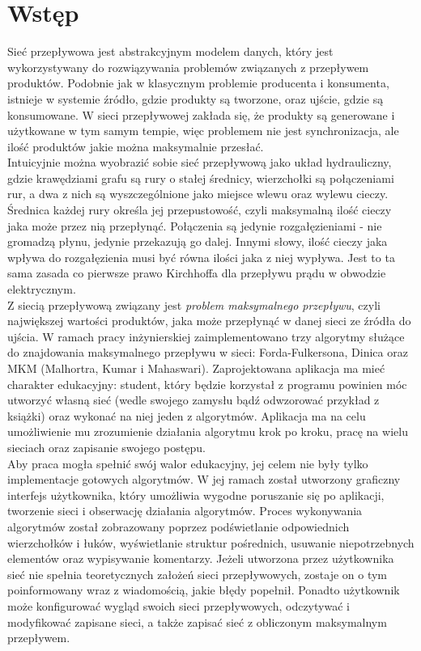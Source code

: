 \chapter{Wstęp}
Sieć przepływowa jest abstrakcyjnym modelem danych, który jest wykorzystywany do rozwiązywania problemów związanych z przepływem produktów. Podobnie jak w klasycznym problemie producenta i konsumenta, istnieje w systemie źródło, gdzie produkty są tworzone, oraz ujście, gdzie są konsumowane. W sieci przepływowej zakłada się, że produkty są generowane i użytkowane w tym samym tempie, więc problemem nie jest synchronizacja, ale ilość produktów jakie można maksymalnie przesłać.\\\indent
Intuicyjnie można wyobrazić sobie sieć przepływową jako układ hydrauliczny, gdzie krawędziami grafu są rury o stałej średnicy, wierzchołki są połączeniami rur, a dwa z nich są wyszczególnione jako miejsce wlewu oraz wylewu cieczy. Średnica każdej rury określa jej przepustowość, czyli maksymalną ilość cieczy jaka może przez nią przepłynąć. Połączenia są jedynie rozgałęzieniami - nie gromadzą płynu, jedynie przekazują go dalej. Innymi słowy, ilość cieczy jaka wpływa do rozgałęzienia musi być równa ilości jaka z niej wypływa. Jest to ta sama zasada co pierwsze prawo Kirchhoffa dla przepływu prądu w obwodzie elektrycznym.\\\indent
Z siecią przepływową związany jest \textit{problem maksymalnego przepływu}, czyli największej wartości produktów, jaka może przepłynąć w danej sieci ze źródła do ujścia. W ramach pracy inżynierskiej zaimplementowano trzy algorytmy służące do znajdowania maksymalnego przepływu w sieci: Forda-Fulkersona, Dinica oraz MKM (Malhortra, Kumar i Mahaswari). Zaprojektowana aplikacja ma mieć charakter edukacyjny: student, który będzie korzystał z programu powinien móc utworzyć własną sieć (wedle swojego zamysłu bądź odwzorować przykład z książki) oraz wykonać na niej jeden z algorytmów. Aplikacja ma na celu umożliwienie mu zrozumienie działania algorytmu krok po kroku, pracę na wielu sieciach oraz zapisanie swojego postępu.\\\indent
Aby praca mogła spełnić swój walor edukacyjny, jej celem nie były tylko implementacje gotowych algorytmów. W jej ramach został utworzony graficzny interfejs użytkownika, który umożliwia wygodne poruszanie się po aplikacji, tworzenie sieci i obserwację działania algorytmów. Proces wykonywania algorytmów został zobrazowany poprzez podświetlanie odpowiednich wierzchołków i łuków, wyświetlanie struktur pośrednich, usuwanie niepotrzebnych elementów oraz wypisywanie komentarzy. Jeżeli utworzona przez użytkownika sieć nie spełnia teoretycznych założeń sieci przepływowych, zostaje on o tym poinformowany wraz z wiadomością, jakie błędy popełnił. Ponadto użytkownik może konfigurować wygląd swoich sieci przepływowych, odczytywać i modyfikować zapisane sieci, a także zapisać sieć z obliczonym maksymalnym przepływem.\\\indent

